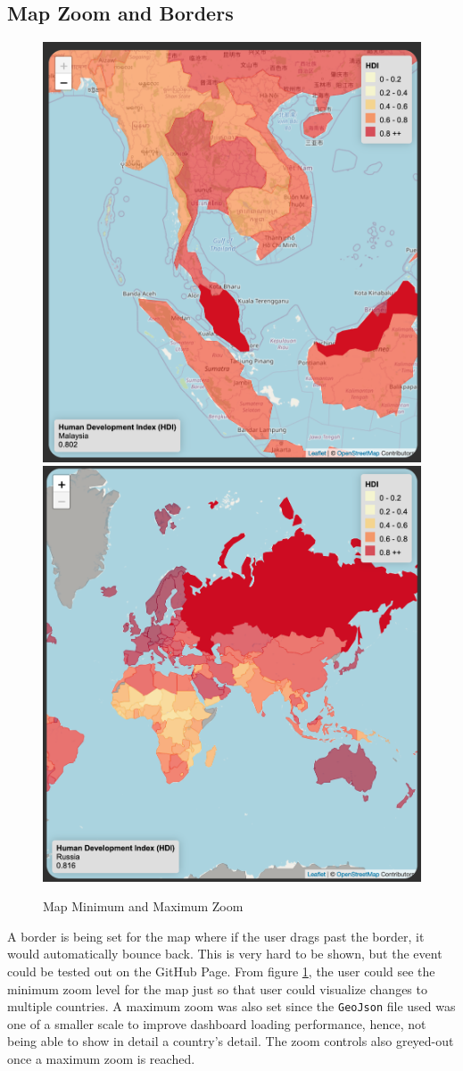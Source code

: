 \documentclass{scrreprt}
\begin{document}
\subsection{Map Zoom and Borders}
\begin{figure}[H]
    \centering
    \includegraphics[height = 0.3\textwidth]{images/map_zoom_1.png}
    \includegraphics[height = 0.3\textwidth]{images/map_zoom_2.png}
    \label{fig:map-zoom}
    \caption{Map Minimum and Maximum Zoom}
\end{figure}
A border is being set for the map where if the user drags past the border, it would automatically bounce back. This is very hard to be shown, but the event could be tested out on the GitHub Page. From figure \ref{fig:map-zoom}, the user could see the minimum zoom level for the map just so that user could visualize changes to multiple countries. A maximum zoom was also set since the \verb|GeoJson| file used was one of a smaller scale to improve dashboard loading performance, hence, not being able to show in detail a country's detail. The zoom controls also greyed-out once a maximum zoom is reached. 
\end{document}
